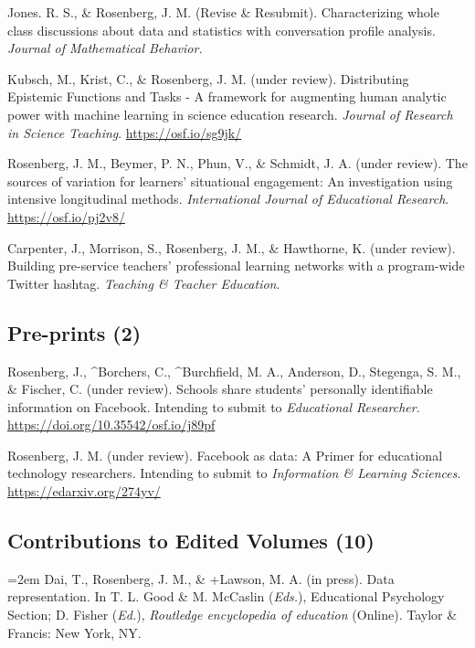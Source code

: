 \documentclass[
  14,
]{article}
\begin{document}
Jones. R. S., \& Rosenberg, J. M. (Revise \& Resubmit). Characterizing
whole class discussions about data and statistics with conversation
profile analysis. \emph{Journal of Mathematical Behavior.}

Kubsch, M., Krist, C., \& Rosenberg, J. M. (under review). Distributing
Epistemic Functions and Tasks - A framework for augmenting human
analytic power with machine learning in science education research.
\emph{Journal of Research in Science Teaching}.
\url{https://osf.io/sg9jk/}

Rosenberg, J. M., Beymer, P. N., Phun, V., \& Schmidt, J. A. (under
review). The sources of variation for learners' situational engagement:
An investigation using intensive longitudinal methods.
\emph{International Journal of Educational Research}.
\url{https://osf.io/pj2v8/}

Carpenter, J., Morrison, S., Rosenberg, J. M., \& Hawthorne, K. (under
review). Building pre-service teachers' professional learning networks
with a program-wide Twitter hashtag. \emph{Teaching \& Teacher
Education}.

\hypertarget{pre-prints-2}{%
\subsection{Pre-prints (2)}\label{pre-prints-2}}

Rosenberg, J., \^{}Borchers, C., \^{}Burchfield, M. A., Anderson, D.,
Stegenga, S. M., \& Fischer, C. (under review). Schools share students'
personally identifiable information on Facebook. Intending to submit to
\emph{Educational Researcher}.
\url{https://doi.org/10.35542/osf.io/j89pf}

Rosenberg, J. M. (under review). Facebook as data: A Primer for
educational technology researchers. Intending to submit to
\emph{Information \& Learning Sciences}.
\url{https://edarxiv.org/274yv/}

\hypertarget{contributions-to-edited-volumes-10}{%
\subsection{Contributions to Edited Volumes
(10)}\label{contributions-to-edited-volumes-10}}

\hangindent=2em Dai, T., Rosenberg, J. M., \& +Lawson, M. A. (in press).
Data representation. In T. L. Good \& M. McCaslin (\emph{Eds.}),
Educational Psychology Section; D. Fisher (\emph{Ed.}), \emph{Routledge
encyclopedia of education} (Online). Taylor \& Francis: New York, NY.
\end{document}
